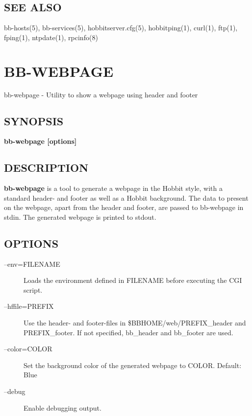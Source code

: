 \subsection{SEE ALSO}
bb-hosts(5), bb-services(5), hobbitserver.cfg(5), hobbitping(1), curl(1), ftp(1), fping(1), ntpdate(1), rpcinfo(8) 


%
\newpage
\section{BB-WEBPAGE}
 bb-webpage - Utility to show a webpage using header and footer \
\subsection{SYNOPSIS}
\textbf{bb-webpage [options]}


 
\subsection{DESCRIPTION}
\textbf{bb-webpage} is a tool to generate a webpage in the Hobbit
style, with a standard header- and footer as well as a Hobbit
background. The data to present on the webpage, apart from the header
and footer, are passed to bb-webpage in stdin. The generated webpage
is printed to stdout. 


 
\subsection{OPTIONS}
\begin{description}
\item[--env=FILENAME] Loads the environment defined in FILENAME before executing the CGI script. 

 

\item[--hffile=PREFIX] Use the header- and footer-files in
  \$BBHOME/web/PREFIX\_header and PREFIX\_footer. If not specified,
  bb\_header and bb\_footer are used. 


 

\item[--color=COLOR] Set the background color of the generated webpage to COLOR. Default: Blue 

 

\item[--debug] Enable debugging output. 

 
\end{description}
